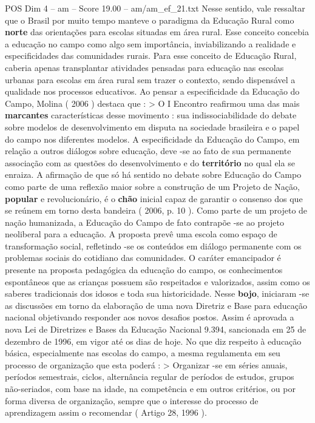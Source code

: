 \begin{textsample}{POS Dim 4 – am – Score 19.00 – am/am\_ef\_21.txt}
Nesse sentido, vale ressaltar que o Brasil por muito tempo manteve o paradigma da Educação Rural como \textbf{norte} das orientações para escolas situadas em área rural.
Esse conceito concebia a educação no campo como algo sem importância, inviabilizando a realidade e especificidades das comunidades rurais.
Para esse conceito de Educação Rural, caberia apenas transplantar atividades pensadas para educação nas escolas urbanas para escolas em área rural sem trazer o contexto, sendo dispensável a qualidade nos processos educativos.
Ao pensar a especificidade da Educação do Campo, Molina ( 2006 ) destaca que : > O I Encontro reafirmou uma das mais \textbf{marcantes} características desse movimento : sua indissociabilidade do debate sobre modelos de desenvolvimento em disputa na sociedade brasileira e o papel do campo nos diferentes modelos.
A especificidade da Educação do Campo, em relação a outros diálogos sobre educação, deve -se ao fato de sua permanente associação com as questões do desenvolvimento e do \textbf{território} no qual ela se enraiza.
A afirmação de que só há sentido no debate sobre Educação do Campo como parte de uma reflexão maior sobre a construção de um Projeto de Nação, \textbf{popular} e revolucionário, é o \textbf{chão} inicial capaz de garantir o consenso dos que se reúnem em torno desta bandeira ( 2006, p. 10 ).
Como parte de um projeto de nação humanizada, a Educação do Campo de fato contrapõe -se ao projeto neoliberal para a educação.
A proposta prevê uma escola como espaço de transformação social, refletindo -se os conteúdos em diálogo permanente com os problemas sociais do cotidiano das comunidades.
O caráter emancipador é presente na proposta pedagógica da educação do campo, os conhecimentos espontâneos que as crianças possuem são respeitados e valorizados, assim como os saberes tradicionais dos idosos e toda sua historicidade.
Nesse \textbf{bojo}, iniciaram -se as discussões em torno da elaboração de uma nova Diretriz e Base para educação nacional objetivando responder aos novos desafios postos.
Assim é aprovada a nova Lei de Diretrizes e Bases da Educação Nacional 9.394, sancionada em 25 de dezembro de 1996, em vigor até os dias de hoje.
No que diz respeito à educação básica, especialmente nas escolas do campo, a mesma regulamenta em seu processo de organização que esta poderá : > Organizar -se em séries anuais, períodos semestrais, ciclos, alternância regular de períodos de estudos, grupos não-seriados, com base na idade, na competência e em outros critérios, ou por forma diversa de organização, sempre que o interesse do processo de aprendizagem assim o recomendar ( Artigo 28, 1996 ).

\end{textsample}

